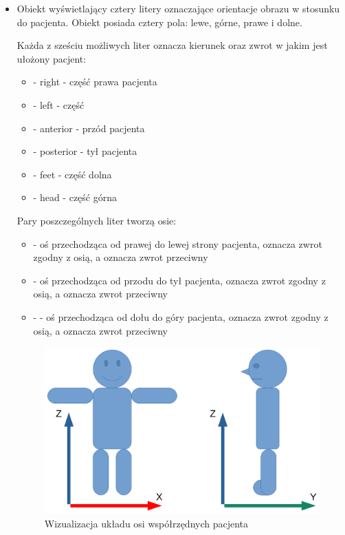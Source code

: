 \begin{itemize}
    \item {}

          Obiekt wyświetlający cztery litery oznaczające orientacje obrazu w stosunku do pacjenta.
          Obiekt posiada cztery pola: lewe, górne, prawe i dolne.

          Każda z sześciu możliwych liter oznacza kierunek oraz zwrot w jakim jest ułożony pacjent:
          \begin{itemize}
              \item {} - right - część prawa pacjenta
              \item {} - left - część
              \item {} - anterior - przód pacjenta
              \item {} - posterior - tył pacjenta
              \item {} - feet - część dolna
              \item {} - head - część górna
          \end{itemize}

          Pary poszczególnych liter tworzą osie:
          \begin{itemize}
              \item {} - oś przechodząca od prawej do lewej strony pacjenta,  oznacza zwrot zgodny z osią, a  oznacza zwrot przeciwny

              \item {} - oś przechodząca od przodu do tył pacjenta,  oznacza zwrot zgodny z osią, a  oznacza zwrot przeciwny

              \item {} -  - oś przechodząca od dołu do góry pacjenta,  oznacza zwrot zgodny z osią, a  oznacza zwrot przeciwny

          \end{itemize}

          \begin{figure}[!htbp]
              \centering
              \includegraphics[width=\textwidth]{img/imageorientationindicator-003.pdf}
              \caption{Wizualizacja układu osi współrzędnych pacjenta}
              \label{fig:imageorientationindicator2}
          \end{figure}


\end{itemize}
